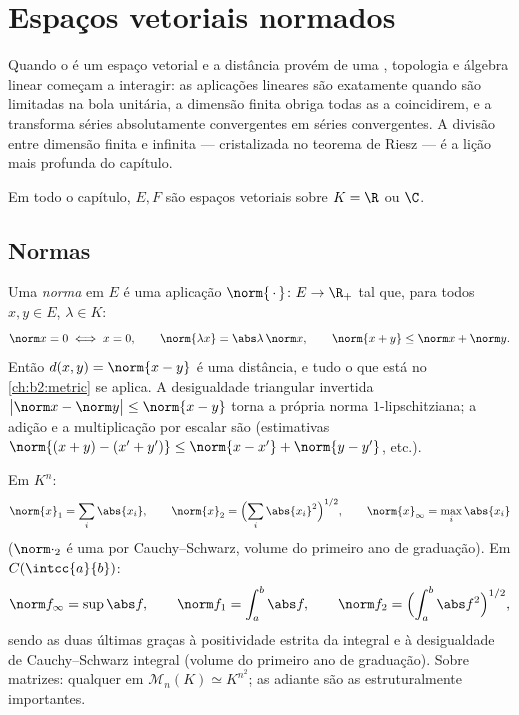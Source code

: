 \chapter{Espaços vetoriais normados}\label{ch:b2:nvs}

Quando o  é um espaço vetorial e a distância provém de
uma , topologia e álgebra linear começam a interagir: as aplicações lineares
são  exatamente quando são limitadas na bola unitária,
a dimensão finita obriga todas as  a coincidirem, e a  transforma
séries absolutamente convergentes em séries convergentes. A
divisão entre dimensão finita e infinita --- cristalizada no teorema de Riesz
--- é a lição mais profunda do capítulo.

Em todo o capítulo, $E, F$ são espaços vetoriais sobre $K = \R$ ou $\C$.

\section{Normas}

\begin{definition}\label{def:b2:nvs:norm}
Uma \emph{norma} em $E$ é uma aplicação $\norm{\,\cdot\,} \colon E
\to \R_+$ tal que, para todos $x, y \in E$, $\lambda \in K$:
\[
\norm x = 0 \iff x = 0,
\qquad
\norm{\lambda x} = \abs\lambda\,\norm x,
\qquad
\norm{x + y} \leq \norm x + \norm y .
\]
Então $d(x, y) = \norm{x - y}$ é uma distância, e tudo o que está no
\cref{ch:b2:metric} se aplica. A desigualdade triangular invertida
$\bigl|\norm x - \norm y\bigr| \leq \norm{x - y}$ torna a própria norma
$1$-lipschitziana; a adição e a multiplicação por escalar são
 (estimativas $\norm{(x + y) - (x' + y')} \leq \norm{x -
x'} + \norm{y - y'}$, etc.).
\end{definition}

\begin{example}\label{ex:b2:nvs:examples}
Em $K^n$:
\[
\norm{x}_1 = \sum_i \abs{x_i},
\qquad
\norm{x}_2 = \Bigl(\sum_i \abs{x_i}^2\Bigr)^{1/2},
\qquad
\norm{x}_\infty = \max_i \abs{x_i}
\]
($\norm\cdot_2$ é uma  por Cauchy--Schwarz, volume do primeiro ano de graduação). Em
$C(\intcc{a}{b})$:
\[
\norm f_\infty = \sup \abs f,
\qquad
\norm f_1 = \int_a^b \abs f,
\qquad
\norm f_2 = \Bigl(\int_a^b \abs f^2\Bigr)^{1/2},
\]
sendo as duas últimas  graças à positividade estrita da
integral e à desigualdade de Cauchy--Schwarz integral (volume do primeiro ano de graduação). Sobre matrizes:
qualquer  em $\mathcal M_n(K) \simeq K^{n^2}$; as 
adiante são as estruturalmente importantes.
\end{example}

